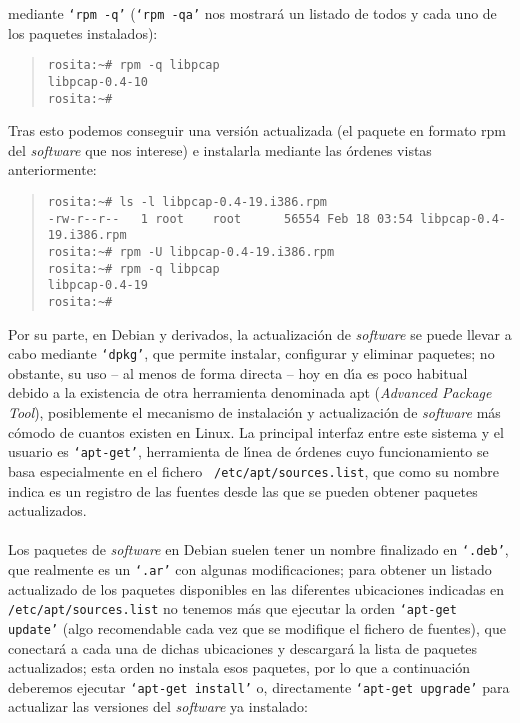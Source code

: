 mediante {\tt `rpm -q'} ({\tt `rpm -qa'} nos mostrar\'a un listado de todos y
cada uno de los paquetes instalados):
\begin{quote}
\begin{verbatim}
rosita:~# rpm -q libpcap
libpcap-0.4-10
rosita:~#
\end{verbatim}
\end{quote}
Tras esto podemos conseguir una versi\'on actualizada (el paquete en formato 
{\sc rpm} del {\it software} que nos interese) e instalarla mediante las
\'ordenes vistas anteriormente:
\begin{quote}
\begin{verbatim}
rosita:~# ls -l libpcap-0.4-19.i386.rpm 
-rw-r--r--   1 root    root      56554 Feb 18 03:54 libpcap-0.4-19.i386.rpm
rosita:~# rpm -U libpcap-0.4-19.i386.rpm 
rosita:~# rpm -q libpcap
libpcap-0.4-19
rosita:~#
\end{verbatim}
\end{quote}
Por su parte, en Debian y derivados, la actualizaci\'on de {\it software} se
puede llevar a cabo mediante {\tt `dpkg'}, que permite instalar, configurar y
eliminar paquetes; no obstante, su uso -- al menos de forma 
directa -- hoy en d\'{\i}a es poco habitual debido a la existencia de otra
herramienta denominada {\sc apt} ({\it Advanced Package Tool}), 
posiblemente el mecanismo de instalaci\'on y actualizaci\'on de {\it software} 
m\'as c\'omodo de cuantos existen en Linux. La principal interfaz entre este 
sistema y el usuario es {\tt `apt-get'}, herramienta de l\'{\i}nea de
\'ordenes cuyo funcionamiento se basa especialmente en el fichero {\tt 
/etc/apt/sources.list}, que como su nombre indica es un registro de las fuentes 
desde las que se pueden obtener paquetes actualizados.\\
\\Los paquetes de {\it software} en Debian suelen tener un nombre finalizado
en {\tt `.deb'}, que realmente es un {\tt `.ar'} con algunas modificaciones; 
para obtener un listado actualizado de los paquetes disponibles en las
diferentes ubicaciones indicadas en {\tt /etc/apt/sources.list} no tenemos
m\'as que ejecutar la orden {\tt `apt-get update'} (algo recomendable cada vez
que se modifique el fichero de fuentes), que conectar\'a a cada una 
de dichas ubicaciones y descargar\'a la lista de paquetes actualizados; esta
orden no instala esos paquetes, por lo que a continuaci\'on deberemos ejecutar 
{\tt `apt-get install'} o, directamente {\tt `apt-get upgrade'} para actualizar 
las versiones del {\it software} ya instalado: 
